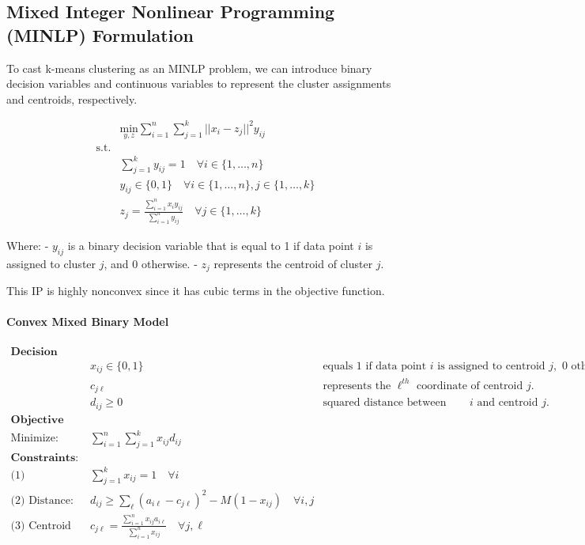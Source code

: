 \subsection{Mixed Integer Nonlinear Programming (MINLP) Formulation}

To cast k-means clustering as an MINLP problem, we can introduce binary decision variables and continuous variables to represent the cluster assignments and centroids, respectively.

\begin{align*}
& \underset{y,z}{\text{min}} \sum_{i=1}^{n} \sum_{j=1}^{k} ||x_i - z_j||^2 y_{ij} \\
\text{s.t.} & \\
& \sum_{j=1}^{k} y_{ij} = 1 \quad \forall i \in \{1, \dots, n\} \\
& y_{ij} \in \{0, 1\} \quad \forall i \in \{1, \dots, n\}, j \in \{1, \dots, k\} \\
& z_j = \frac{\sum_{i=1}^{n} x_i y_{ij}}{\sum_{i=1}^{n} y_{ij}} \quad \forall j \in \{1, \dots, k\}
\end{align*}

Where:
- \(y_{ij}\) is a binary decision variable that is equal to 1 if data point \(i\) is assigned to cluster \(j\), and 0 otherwise.
- \(z_j\) represents the centroid of cluster \(j\).

This IP is highly nonconvex since it has cubic terms in the objective function.

\paragraph{Convex Mixed Binary Model}
\begin{align*}
\textbf{Decision Variables:} \\
& x_{ij} \in \{0,1\} & \text{equals 1 if data point } i \text{ is assigned to centroid } j, \text{ 0 otherwise.} \\
& c_{j\ell} & \text{represents the } \ell^{th} \text{ coordinate of centroid } j. \\
& d_{ij} \geq 0 & \text{squared distance between data point } i \text{ and centroid } j. \\
\textbf{Objective Function:} \\
\text{Minimize:} \quad & \sum_{i=1}^{n} \sum_{j=1}^{k} x_{ij} d_{ij} \\
\textbf{Constraints:} \\
\text{(1) Assignment:} \quad & \sum_{j=1}^{k} x_{ij} = 1 \quad \forall i \\
\text{(2) Distance:} \quad & d_{ij} \geq \sum_{\ell} (a_{i\ell} - c_{j\ell})^2 - M(1 - x_{ij}) \quad \forall i,j \\
\text{(3) Centroid Coordinate:} \quad & c_{j\ell} = \frac{\sum_{i=1}^{n} x_{ij} a_{i\ell}}{\sum_{i=1}^{n} x_{ij}} \quad \forall j, \ell \\
\end{align*}


